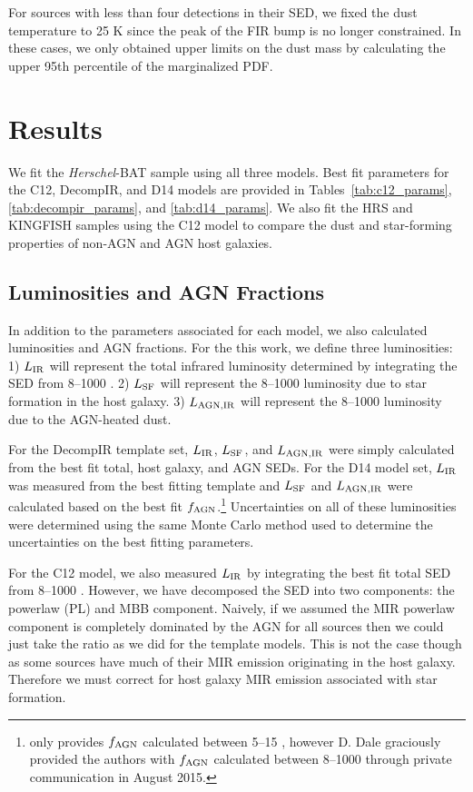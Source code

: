 \documentclass[fleqn, usenatbib]{mnras}
\newcommand{\herschel}{\emph{Herschel}}
\begin{document}
For sources with less than four detections in their SED, we fixed the dust temperature to 25 K since the peak of the FIR bump is no longer constrained. In these cases, we only obtained upper limits on the dust mass by calculating the upper 95th percentile of the marginalized PDF.

\section{Results}
We fit the \herschel-BAT sample using all three models. Best fit parameters for the C12, DecompIR, and D14 models are provided in Tables~\ref{tab:c12_params}, \ref{tab:decompir_params}, and \ref{tab:d14_params}. We also fit the HRS and KINGFISH samples using the C12 model to compare the dust and star-forming properties of non-AGN and AGN host galaxies. 

\subsection{Luminosities and AGN Fractions}
In addition to the parameters associated for each model, we also calculated luminosities and AGN fractions. For the this work, we define three luminosities: 1) $L_{\rm IR}$ will represent the total infrared luminosity determined by integrating the SED from 8--1000 \micron. 2) $L_{\rm SF}$ will represent the 8--1000 \micron{} luminosity due to star formation in the host galaxy. 3) $L_{\rm AGN, IR}$ will represent the 8--1000 \micron luminosity due to the AGN-heated dust. 

For the DecompIR template set, $L_{\rm IR}$, $L_{\rm SF}$, and $L_{\rm AGN, IR}$ were simply calculated from the best fit total, host galaxy, and AGN SEDs. For the D14 model set, $L_{\rm IR}$ was measured from the best fitting template and $L_{\rm SF}$ and $L_{\rm AGN, IR}$ were calculated based on the best fit $f_{\rm AGN}$.\footnote{\citet{Dale:2014yq} only provides $f_{\rm AGN}$ calculated between 5--15 \micron, however D. Dale graciously provided the authors with $f_{\rm AGN}$ calculated between 8--1000 \micron{} through private communication in August 2015.} Uncertainties on all of these luminosities were determined using the same Monte Carlo method used to determine the uncertainties on the best fitting parameters.

For the C12 model, we also measured $L_{\rm IR}$ by integrating the best fit total SED from 8--1000 \micron. However, we have decomposed the SED into two components: the powerlaw (PL) and MBB component. Naively, if we assumed the MIR powerlaw component is completely dominated by the AGN for all sources then we could just take the ratio as we did for the template models. This is not the case though as some sources have much of their MIR emission originating in the host galaxy. Therefore we must correct for host galaxy MIR emission associated with star formation.
\end{document}
